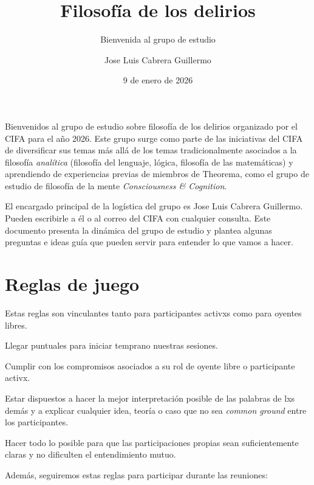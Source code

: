 \documentclass[a4paper,nofonts,justified]{tufte-handout}
\title{Filosofía de los delirios}
\subtitle{Bienvenida al grupo de estudio}
\author{Jose Luis Cabrera Guillermo}
\date{9 de enero de 2026}
\begin{document}
\maketitle

Bienvenidos al grupo de estudio sobre filosofía de los delirios organizado por el CIFA para el año 2026. Este grupo surge como parte de las iniciativas del CIFA de diversificar sus temas más allá de los temas tradicionalmente asociados a la filosofía \emph{analítica} (filosofía del lenguaje, lógica, filosofía de las matemáticas) y aprendiendo de experiencias previas de miembros de Theorema, como el grupo de estudio de filosofía de la mente \emph{Consciousness \& Cognition}.

El encargado principal de la logística del grupo es Jose Luis Cabrera Guillermo. Pueden escribirle a él o al correo del CIFA con cualquier consulta. Este documento presenta la dinámica del grupo de estudio y plantea algunas preguntas e ideas guía que pueden servir para entender lo que vamos a hacer.

\section{Reglas de juego}
Estas reglas son vinculantes tanto para participantes activxs como para oyentes libres.

\begin{rules}
  \item[Puntualidad] Llegar puntuales para iniciar temprano nuestras sesiones.
  \item[Compromiso] Cumplir con los compromisos asociados a su rol de oyente libre o participante activx.
  \item[Máxima caridad] Estar dispuestos a hacer la mejor interpretación posible de las palabras de lxs demás y a explicar cualquier idea, teoría o caso que no sea \emph{common ground} entre los participantes.
  \item[Claridad] Hacer todo lo posible para que las participaciones propias sean suficientemente claras y no dificulten el entendimiento mutuo.
\end{rules}

Además, seguiremos estas reglas para participar durante las reuniones:
\end{document}
